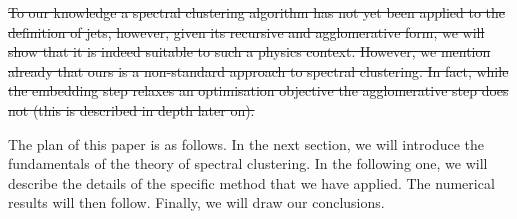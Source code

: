 

\sout{To our knowledge a spectral clustering algorithm has not yet been applied to the
    definition of jets, %
however, given its recursive and agglomerative form, we will show that it is indeed suitable to such a physics context. However, we 
mention already that ours is a non-standard approach to spectral clustering. In fact, while the embedding step relaxes an optimisation objective 
the agglomerative step does not (this is described in depth later on).}

The plan of this paper is as follows. In the next section, we will introduce the fundamentals of the theory of spectral clustering. In the following one, we will describe the details of the specific method that we have applied. The numerical results will then follow. Finally, we will draw our conclusions. 
